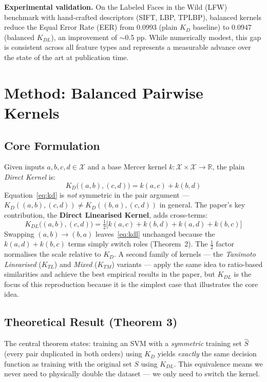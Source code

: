 \documentclass[conference]{IEEEtran}
\begin{document}
\textbf{Experimental validation.}
On the Labeled Faces in the Wild (LFW) benchmark with hand-crafted
descriptors (SIFT, LBP, TPLBP), balanced kernels reduce the Equal Error
Rate (EER) from 0.0993 (plain $K_D$ baseline) to 0.0947 (balanced
$K_{DL}$), an improvement of $\sim$0.5 pp. While numerically modest, this
gap is consistent across all feature types and represents a measurable
advance over the state of the art at publication time.

\section{Method: Balanced Pairwise Kernels}

\subsection{Core Formulation}

Given inputs $a, b, c, d \in \mathcal{X}$ and a base Mercer kernel
$k: \mathcal{X}\times\mathcal{X}\to\mathbb{R}$, the plain
\emph{Direct Kernel} is:
\begin{equation}
  K_D\!\bigl((a,b),(c,d)\bigr) = k(a,c) + k(b,d)
  \label{eq:kd}
\end{equation}
Equation~\eqref{eq:kd} is \emph{not} symmetric in the pair argument ---
$K_D((a,b),(c,d)) \neq K_D((b,a),(c,d))$ in general. The paper's key
contribution, the \textbf{Direct Linearised Kernel}, adds cross-terms:
\begin{equation}
  K_{DL}\!\bigl((a,b),(c,d)\bigr)
    = \tfrac{1}{2}\bigl[k(a,c)+k(b,d)+k(a,d)+k(b,c)\bigr]
  \label{eq:kdl}
\end{equation}
Swapping $(a,b)\!\to\!(b,a)$ leaves~\eqref{eq:kdl} unchanged because
the $k(a,d)+k(b,c)$ terms simply switch roles (Theorem~2).
The $\tfrac{1}{2}$ factor normalises the scale relative to $K_D$.
A second family of kernels --- the \emph{Tanimoto Linearised} ($K_{TL}$)
and \emph{Mixed} ($K_{TM}$) variants --- apply the same idea to
ratio-based similarities and achieve the best empirical results in the
paper, but $K_{DL}$ is the focus of this reproduction because it is the
simplest case that illustrates the core idea.

\subsection{Theoretical Result (Theorem 3)}

The central theorem states: training an SVM with a \emph{symmetric}
training set $\hat{S}$ (every pair duplicated in both orders) using $K_D$
yields \emph{exactly} the same decision function as training with the
original set $S$ using $K_{DL}$. This equivalence means we never need to
physically double the dataset --- we only need to switch the kernel.
\end{document}
